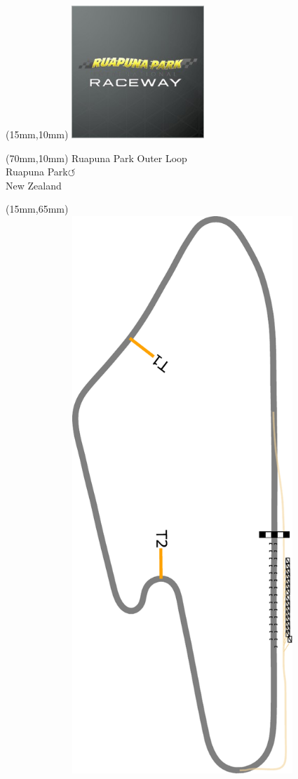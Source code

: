 \null\newpage
\begin{textblock*}{50mm}(15mm,10mm)%
\includegraphics[width=50mm]{LG/RUPU.png}
\end{textblock*}
\begin{textblock*}{130mm}(70mm,10mm)%
{\fontsize{20}{20}\selectfont Ruapuna Park Outer Loop\\}
{\fontsize{16}{16}\selectfont Ruapuna Park\hfill \huge$\circlearrowleft$\\}
{\fontsize{12}{12}\selectfont New Zealand\\}
\end{textblock*}
\begin{textblock*}{185mm}(15mm,65mm)%
\centering
\mbox{\includegraphics[width=185mm,height=210mm,keepaspectratio]{PT/RPOL.pdf}}
\end{textblock*}
